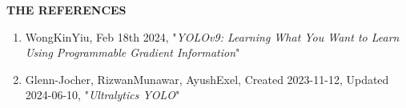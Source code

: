 \documentclass[a4paper,13pt]{report}
\begin{document}
    

    

    

    \newpage
    \thispagestyle{plain}
    \begin{center}
        \Huge{\textbf{THE REFERENCES}}
    \end{center}
    \vspace{3mm}
    \begin{enumerate}
        \item WongKinYiu, Feb 18th 2024, "\textit{YOLOv9: Learning What You Want to Learn Using Programmable Gradient Information}"
        \item Glenn-Jocher, RizwanMunawar, AyushExel, Created 2023-11-12, Updated 2024-06-10, "\textit{Ultralytics YOLO}"
    \end{enumerate}

    
\end{document}
